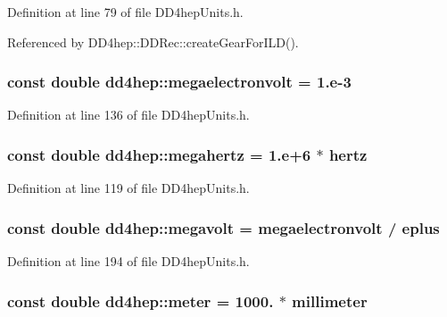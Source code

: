 Definition at line 79 of file DD4hepUnits.h.

Referenced by DD4hep::DDRec::createGearForILD().\hypertarget{namespacedd4hep_a4e39beba039f7a6bda24a7031c121b2a}{
\subsubsection[{megaelectronvolt}]{\setlength{\rightskip}{0pt plus 5cm}const double {\bf dd4hep::megaelectronvolt} = 1.e-\/3}}
\label{namespacedd4hep_a4e39beba039f7a6bda24a7031c121b2a}


Definition at line 136 of file DD4hepUnits.h.\hypertarget{namespacedd4hep_a67e1a0f3e5d536a61c5b88820e284f6e}{
\subsubsection[{megahertz}]{\setlength{\rightskip}{0pt plus 5cm}const double {\bf dd4hep::megahertz} = 1.e+6 $\ast$ {\bf hertz}}}
\label{namespacedd4hep_a67e1a0f3e5d536a61c5b88820e284f6e}


Definition at line 119 of file DD4hepUnits.h.\hypertarget{namespacedd4hep_a0899b6d1861ddc5f615d06209fb6a9fe}{
\subsubsection[{megavolt}]{\setlength{\rightskip}{0pt plus 5cm}const double {\bf dd4hep::megavolt} = {\bf megaelectronvolt} / {\bf eplus}}}
\label{namespacedd4hep_a0899b6d1861ddc5f615d06209fb6a9fe}


Definition at line 194 of file DD4hepUnits.h.\hypertarget{namespacedd4hep_a46f5cf0231796af4296a307a58812b06}{
\subsubsection[{meter}]{\setlength{\rightskip}{0pt plus 5cm}const double {\bf dd4hep::meter} = 1000. $\ast$ {\bf millimeter}}}
\label{namespacedd4hep_a46f5cf0231796af4296a307a58812b06}


